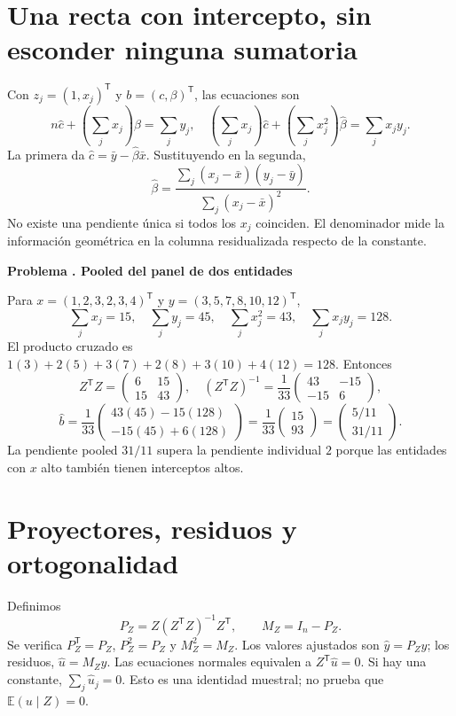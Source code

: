\documentclass[11pt,a4paper]{article}
\newcommand{\E}{\mathbb E}
\newcommand{\T}{^{\mathsf T}}
\theoremstyle{definition}
\newcounter{problema}
\newenvironment{resuelto}[1]{\refstepcounter{problema}\par\medskip\Needspace{6\baselineskip}\textbf{Problema \theproblema. #1}\par}{\par\medskip}
\begin{document}
\section{Una recta con intercepto, sin esconder ninguna sumatoria}
Con $z_j=(1,x_j)\T$ y $b=(c,\beta)\T$, las ecuaciones son
\[
n\widehat c+\left(\sum_jx_j\right)\widehat\beta=\sum_jy_j,
\quad
\left(\sum_jx_j\right)\widehat c+
\left(\sum_jx_j^2\right)\widehat\beta=\sum_jx_jy_j.
\]
La primera da $\widehat c=\bar y-\widehat\beta\bar x$. Sustituyendo en la segunda,
\[
\widehat\beta
=\frac{\sum_j(x_j-\bar x)(y_j-\bar y)}
{\sum_j(x_j-\bar x)^2}.
\]
No existe una pendiente única si todos los $x_j$ coinciden. El denominador mide la información geométrica en la columna residualizada respecto de la constante.

\begin{resuelto}{Pooled del panel de dos entidades}
Para $x=(1,2,3,2,3,4)\T$ y $y=(3,5,7,8,10,12)\T$,
\[
\sum_jx_j=15,\quad \sum_jy_j=45,\quad
\sum_jx_j^2=43,\quad \sum_jx_jy_j=128.
\]
El producto cruzado es $1(3)+2(5)+3(7)+2(8)+3(10)+4(12)=128$.
Entonces
\[
Z\T Z=\begin{pmatrix}6&15\\15&43\end{pmatrix},\quad
(Z\T Z)^{-1}=\frac1{33}\begin{pmatrix}43&-15\\-15&6\end{pmatrix},
\]
\[
\widehat b=\frac1{33}\begin{pmatrix}43(45)-15(128)\\-15(45)+6(128)\end{pmatrix}
=\frac1{33}\begin{pmatrix}15\\93\end{pmatrix}
=\begin{pmatrix}5/11\\31/11\end{pmatrix}.
\]
La pendiente pooled $31/11$ supera la pendiente individual $2$ porque las entidades con $x$ alto también tienen interceptos altos.
\end{resuelto}


\section{Proyectores, residuos y ortogonalidad}
Definimos
\[
P_Z=Z(Z\T Z)^{-1}Z\T,\qquad M_Z=I_n-P_Z.
\]
Se verifica $P_Z\T=P_Z$, $P_Z^2=P_Z$ y $M_Z^2=M_Z$.
Los valores ajustados son $\widehat y=P_Zy$; los residuos, $\widehat u=M_Zy$. Las ecuaciones normales equivalen a $Z\T\widehat u=0$.
Si hay una constante, $\sum_j\widehat u_j=0$. Esto es una identidad muestral; no prueba que $\E(u\mid Z)=0$.
\end{document}
